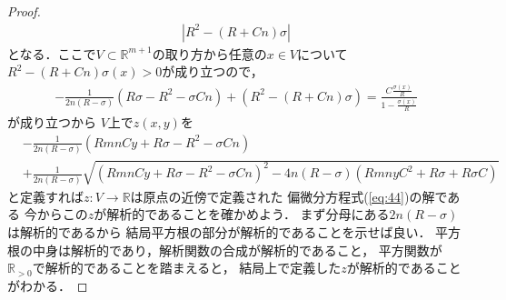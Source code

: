 \documentclass[leqno, a4paper, 12pt]{jsarticle}
\newcommand{\rr}{\mathbb{R}}
\begin{document}
\begin{proof}
\begin{align*}
|R^2-(R+Cn)\sigma|
\end{align*}
となる．ここで$V\subset \rr^{m+1}$の取り方から任意の$x\in V$について
$R^2-(R+Cn)\sigma(x)>0$が成り立つので，
\begin{align*}
-\frac{1}{2n(R-\sigma)}\left(R\sigma-R^2-\sigma Cn\right)+
(R^2-(R+Cn)\sigma)=
\frac{C\frac{\sigma(x)}{R}}{1-\frac{\sigma(x)}{R}}
\end{align*}
が成り立つから
$V$上で$z(x, y)$を
\begin{align*}
&-\frac{1}{2n(R-\sigma)}\left(RmnCy+R\sigma-R^2-\sigma Cn\right)\\
&+\frac{1}{2n(R-\sigma)}\sqrt{(RmnCy+R\sigma-R^2-\sigma Cn)^2-4n(R-\sigma)(RmnyC^2+R\sigma+R\sigma C)}
\end{align*}
と定義すれば$z: V\to \rr$は原点の近傍で定義された
偏微分方程式(\ref{eq:44})の解である
今からこの$z$が解析的であることを確かめよう．
まず分母にある$2n(R-\sigma)$は解析的であるから
結局平方根の部分が解析的であることを示せば良い．
平方根の中身は解析的であり，解析関数の合成が解析的であること，
平方関数が$\rr_{>0}$で解析的であることを踏まえると，
結局上で定義した$z$が解析的であることがわかる．
\end{proof}
\end{document}
